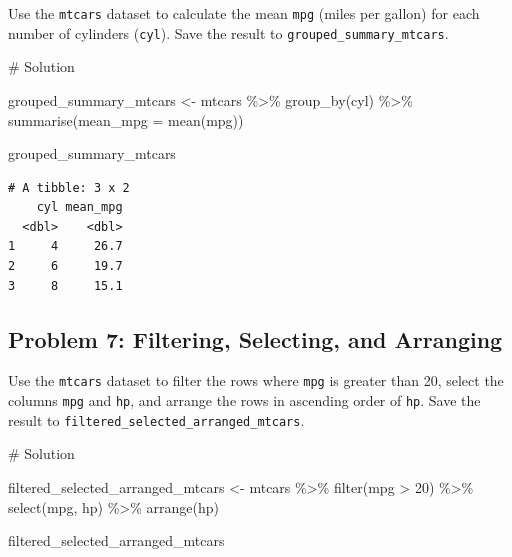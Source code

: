\documentclass[
  letterpaper,
  DIV=11,
  numbers=noendperiod]{scrreprt}
\newenvironment{Shaded}{\begin{snugshade}}{\end{snugshade}}
\newcommand{\AttributeTok}[1]{\textcolor[rgb]{0.40,0.45,0.13}{#1}}
\newcommand{\CommentTok}[1]{\textcolor[rgb]{0.37,0.37,0.37}{#1}}
\newcommand{\DecValTok}[1]{\textcolor[rgb]{0.68,0.00,0.00}{#1}}
\newcommand{\FunctionTok}[1]{\textcolor[rgb]{0.28,0.35,0.67}{#1}}
\newcommand{\NormalTok}[1]{\textcolor[rgb]{0.00,0.23,0.31}{#1}}
\newcommand{\OtherTok}[1]{\textcolor[rgb]{0.00,0.23,0.31}{#1}}
\newcommand{\SpecialCharTok}[1]{\textcolor[rgb]{0.37,0.37,0.37}{#1}}
\begin{document}
Use the \texttt{mtcars} dataset to calculate the mean \texttt{mpg}
(miles per gallon) for each number of cylinders (\texttt{cyl}). Save the
result to \texttt{grouped\_summary\_mtcars}.

\begin{Shaded}
\begin{Highlighting}[]
\CommentTok{\# Solution}

\NormalTok{grouped\_summary\_mtcars }\OtherTok{\textless{}{-}}\NormalTok{ mtcars }\SpecialCharTok{\%\textgreater{}\%}
  \FunctionTok{group\_by}\NormalTok{(cyl) }\SpecialCharTok{\%\textgreater{}\%}
  \FunctionTok{summarise}\NormalTok{(}\AttributeTok{mean\_mpg =} \FunctionTok{mean}\NormalTok{(mpg))}

\NormalTok{grouped\_summary\_mtcars}
\end{Highlighting}
\end{Shaded}

\begin{verbatim}
# A tibble: 3 x 2
    cyl mean_mpg
  <dbl>    <dbl>
1     4     26.7
2     6     19.7
3     8     15.1
\end{verbatim}

\subsection*{Problem 7: Filtering, Selecting, and
Arranging}\label{problem-7-filtering-selecting-and-arranging}

Use the \texttt{mtcars} dataset to filter the rows where \texttt{mpg} is
greater than 20, select the columns \texttt{mpg} and \texttt{hp}, and
arrange the rows in ascending order of \texttt{hp}. Save the result to
\texttt{filtered\_selected\_arranged\_mtcars}.

\begin{Shaded}
\begin{Highlighting}[]
\CommentTok{\# Solution}

\NormalTok{filtered\_selected\_arranged\_mtcars }\OtherTok{\textless{}{-}}\NormalTok{ mtcars }\SpecialCharTok{\%\textgreater{}\%}
  \FunctionTok{filter}\NormalTok{(mpg }\SpecialCharTok{\textgreater{}} \DecValTok{20}\NormalTok{) }\SpecialCharTok{\%\textgreater{}\%}
  \FunctionTok{select}\NormalTok{(mpg, hp) }\SpecialCharTok{\%\textgreater{}\%}
  \FunctionTok{arrange}\NormalTok{(hp)}

\NormalTok{filtered\_selected\_arranged\_mtcars}
\end{Highlighting}
\end{Shaded}
\end{document}
